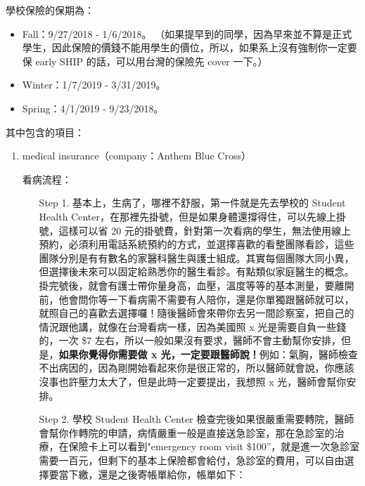\documentclass[10pt,a4paper]{book}
\begin{document}
\begin{CJK}{UTF8}{bkai}
學校保險的保期為：
\begin{itemize}
\item Fall：9/27/2018 - 1/6/2018。 （如果提早到的同學，因為早來並不算是正式學生，因此保險的價錢不能用學生的價位，所以，如果系上沒有強制你一定要保 early SHIP 的話，可以用台灣的保險先 cover 一下。）
\item Winter：1/7/2019 - 3/31/2019。
\item Spring：4/1/2019 - 9/23/2018。
\end{itemize}

其中包含的項目：
\begin{enumerate}
\item medical insurance（company：Anthem Blue Cross）


看病流程：
\begin{enumerate}

\item[Step 1.] 基本上，生病了，哪裡不舒服，第一件就是先去學校的 Student Health Center，在那裡先掛號，但是如果身體還撐得住，可以先線上掛號，這樣可以省 20 元的掛號費，針對第一次看病的學生，無法使用線上預約，必須利用電話系統預約的方式，並選擇喜歡的看整團隊看診，這些團隊分別是有有數名的家醫科醫生與護士組成。其實每個團隊大同小異，但選擇後未來可以固定給熟悉你的醫生看診。有點類似家庭醫生的概念。掛完號後，就會有護士帶你量身高，血壓，溫度等等的基本測量，要離開前，他會問你等一下看病需不需要有人陪你，還是你單獨跟醫師就可以，就照自己的喜歡去選擇囉！隨後醫師會來帶你去另一間診察室，把自己的情況跟他講，就像在台灣看病一樣，因為美國照 x 光是需要自負一些錢的，一次 \$7 左右，所以一般如果沒有要求，醫師不會主動幫你安排，但是，\textbf{如果你覺得你需要做 x 光，一定要跟醫師說！}例如：氣胸，醫師檢查不出病因的，因為剛開始看起來你是很正常的，所以醫師就會說，你應該沒事也許壓力太大了，但是此時一定要提出，我想照 x 光，醫師會幫你安排。

\item[Step 2.] 學校 Student Health Center 檢查完後如果很嚴重需要轉院，醫師會幫你作轉院的申請，病情嚴重一般是直接送急診室，那在急診室的治療，在保險卡上可以看到"emergency room visit \$100''，就是進一次急診室需要一百元，但剩下的基本上保險都會給付，急診室的費用，可以自由選擇要當下繳，還是之後寄帳單給你，帳單如下：


\end{enumerate}
\end{enumerate}
\end{CJK}
\end{document}
